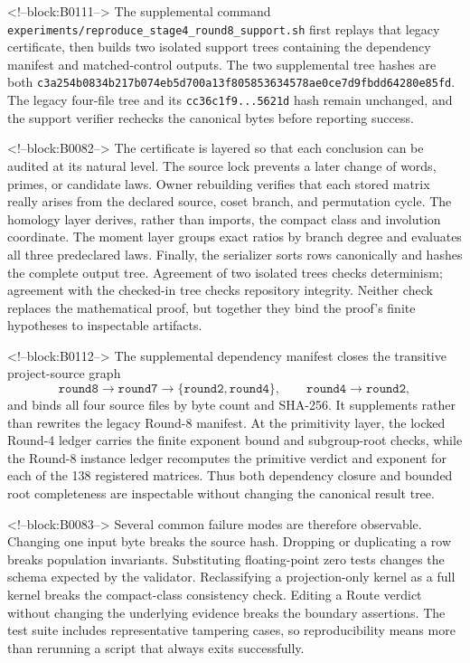 \documentclass[11pt]{article}
\theoremstyle{definition}
\theoremstyle{remark}
\begin{document}
<!--block:B0111-->
The supplemental command \texttt{experiments/reproduce\_stage4\_round8\_support.sh} first replays that legacy certificate, then builds two isolated support trees containing the dependency manifest and matched-control outputs. The two supplemental tree hashes are both \texttt{c3a254b0834b217b074eb5d700a13f805853634578ae0ce7d9fbdd64280e85fd}. The legacy four-file tree and its \texttt{cc36c1f9...5621d} hash remain unchanged, and the support verifier rechecks the canonical bytes before reporting success.

<!--block:B0082-->
The certificate is layered so that each conclusion can be audited at its natural level. The source lock prevents a later change of words, primes, or candidate laws. Owner rebuilding verifies that each stored matrix really arises from the declared source, coset branch, and permutation cycle. The homology layer derives, rather than imports, the compact class and involution coordinate. The moment layer groups exact ratios by branch degree and evaluates all three predeclared laws. Finally, the serializer sorts rows canonically and hashes the complete output tree. Agreement of two isolated trees checks determinism; agreement with the checked-in tree checks repository integrity. Neither check replaces the mathematical proof, but together they bind the proof's finite hypotheses to inspectable artifacts.

<!--block:B0112-->
The supplemental dependency manifest closes the transitive project-source graph
\[
\texttt{round8}\longrightarrow\texttt{round7}
\longrightarrow\{\texttt{round2},\texttt{round4}\},
\qquad
\texttt{round4}\longrightarrow\texttt{round2},
\]
and binds all four source files by byte count and SHA-256. It supplements rather than rewrites the legacy Round-8 manifest. At the primitivity layer, the locked Round-4 ledger carries the finite exponent bound and subgroup-root checks, while the Round-8 instance ledger recomputes the primitive verdict and exponent for each of the 138 registered matrices. Thus both dependency closure and bounded root completeness are inspectable without changing the canonical result tree.

<!--block:B0083-->
Several common failure modes are therefore observable. Changing one input byte breaks the source hash. Dropping or duplicating a row breaks population invariants. Substituting floating-point zero tests changes the schema expected by the validator. Reclassifying a projection-only kernel as a full kernel breaks the compact-class consistency check. Editing a Route verdict without changing the underlying evidence breaks the boundary assertions. The test suite includes representative tampering cases, so reproducibility means more than rerunning a script that always exits successfully.
\end{document}
